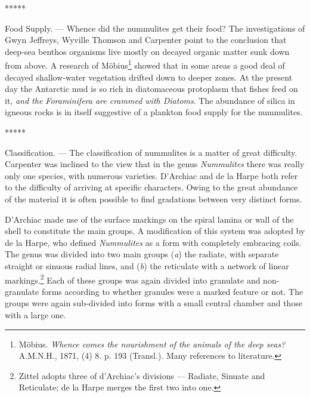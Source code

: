 \documentclass[a4paper, 12pt, oneside, landscape]{article}
\begin{document}
\centerline{*\hspace{15mm}*\hspace{15mm}*\hspace{15mm}*\hspace{15mm}*}
\bigskip

Food Supply. --- Whence did the nummulites get their food? The investigations of Gwyn Jeffreys, Wyville Thomson and Carpenter point to the conclusion that deep-sea benthos organisms live mostly on decayed organic matter sunk down from above. A research of Möbius\footnote{Möbius. \emph{Whence comes the nourishment of the animals of the deep seas?} A.M.N.H., 1871, (4) 8. p. 193 (Transl.). Many references to literature.} showed that in some areas a good deal of decayed shallow-water vegetation drifted down to deeper zones. At the present day the Antarctic mud is so rich in diatomaceous protoplasm that fishes feed on it, \emph{and the Foraminifera are crammed with Diatoms}. The abundance of silica in igneous rocks is in itself suggestive of a plankton food supply for the nummulites.

\centerline{*\hspace{15mm}*\hspace{15mm}*\hspace{15mm}*\hspace{15mm}*}
\bigskip

Classification. --- The classification of nummulites is a matter of great difficulty. Carpenter was inclined to the view that in the genus \emph{Nummulites} there was really only one species, with numerous varieties. D'Archiac and de la Harpe both refer to the difficulty of arriving at specific characters. Owing to the great abundance of the material it is often possible to find gradations between very distinct forms.

D'Archiac made use of the surface markings on the spiral lamina or wall of the shell to constitute the main groups. A modification of this system was adopted by de la Harpe, who defined \emph{Nummulites} as a form with completely embracing coils. The genus was divided into two main groups (\emph{a}) the radiate, with separate straight or sinuous radial lines, and (\emph{b}) the reticulate with a network of linear markings.\footnote{Zittel adopts three of d'Archiac's divisions --- Radiate, Sinuate and Reticulate; de la Harpe merges the first two into one.} Each of these groups was again divided into granulate and non-granulate forms according to whether granules were a marked feature or not. The groups were again sub-divided into forms with a small central chamber and those with a large one.
\end{document}
